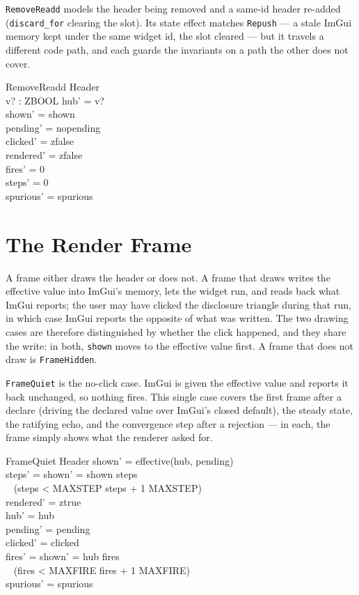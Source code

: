 \documentclass[a4paper,10pt,fleqn]{article}
\begin{document}
\texttt{RemoveReadd} models the header being removed and a same-id header
re-added (\texttt{discard\_for} clearing the slot).  Its state effect matches
\texttt{Repush} --- a stale ImGui memory kept under the same widget id, the
slot cleared --- but it travels a different code path, and each guards the
invariants on a path the other does not cover.

\begin{schema}{RemoveReadd}
  \Delta Header \\
  v? : ZBOOL
\where
  hub' = v? \\
  shown' = shown \\
  pending' = nopending \\
  clicked' = zfalse \\
  rendered' = zfalse \\
  fires' = 0 \\
  steps' = 0 \\
  spurious' = spurious
\end{schema}

\section{The Render Frame}

A frame either draws the header or does not.  A frame that draws writes the
effective value into ImGui's memory, lets the widget run, and reads back what
ImGui reports; the user may have clicked the disclosure triangle during that
run, in which case ImGui reports the opposite of what was written.  The two
drawing cases are therefore distinguished by whether the click happened, and
they share the write: in both, \texttt{shown} moves to the effective value
first.  A frame that does not draw is \texttt{FrameHidden}.

\texttt{FrameQuiet} is the no-click case.  ImGui is given the effective value
and reports it back unchanged, so nothing fires.  This single case covers the
first frame after a declare (driving the declared value over ImGui's closed
default), the steady state, the ratifying echo, and the convergence step after
a rejection --- in each, the frame simply shows what the renderer asked for.

\begin{schema}{FrameQuiet}
  \Delta Header
\where
  shown' = effective(hub, pending) \\
  steps' = \IF shown' = shown \THEN steps \\
\quad~  \ELSE (\IF steps < MAXSTEP \THEN steps + 1 \ELSE MAXSTEP) \\
  rendered' = ztrue \\
  hub' = hub \\
  pending' = pending \\
  clicked' = clicked \\
  fires' = \IF shown' = hub \THEN fires \\
\quad~  \ELSE (\IF fires < MAXFIRE \THEN fires + 1 \ELSE MAXFIRE) \\
  spurious' = spurious
\end{schema}
\end{document}
